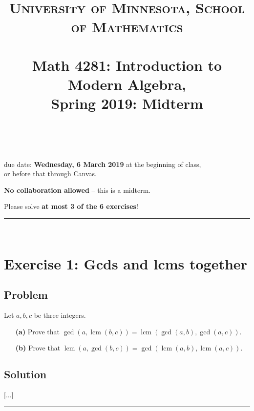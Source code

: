 \documentclass[paper=a4, fontsize=12pt]{scrartcl} %
\title{	
\normalfont \normalsize 
\textsc{University of Minnesota, School of Mathematics} \\ [25pt] %
\horrule{0.5pt} \\[0.4cm] %
\huge Math 4281: Introduction to Modern Algebra, \\
Spring 2019:
Midterm \psetnumber\\%
\horrule{2pt} \\[0.5cm] %
}
\author{\myname}
\newcommand{\lcm}{\operatorname{lcm}}
\newcommand{\tup}[1]{\left( #1 \right)}
\newcommand{\horrule}[1]{\rule{\linewidth}{#1}} %
\theoremstyle{plainsl}
\theoremstyle{definition}
\theoremstyle{remark}
\begin{document}
\maketitle %

\begin{center} %
{\large due date: \textbf{Wednesday, 6 March 2019} at the beginning of class, \\
or before that through Canvas.

\textbf{No collaboration allowed} -- this is a midterm.

Please solve \textbf{at most 3 of the 6 exercises}!}
\end{center}

\horrule{0.3pt} \\[0.4cm]

\section{Exercise 1: Gcds and lcms together}

\subsection{Problem}

Let $a, b, c$ be three integers.

\begin{enumerate}

\item[\textbf{(a)}]
Prove that
$\gcd\tup{a, \lcm\tup{b, c}}
= \lcm\tup{\gcd\tup{a, b}, \gcd\tup{a, c}}$.

\item[\textbf{(b)}]
Prove that
$\lcm\tup{a, \gcd\tup{b, c}}
= \gcd\tup{\lcm\tup{a, b}, \lcm\tup{a, c}}$.

\end{enumerate}

\subsection{Solution}

[...]

\horrule{0.3pt} \\[0.4cm]
\end{document}
